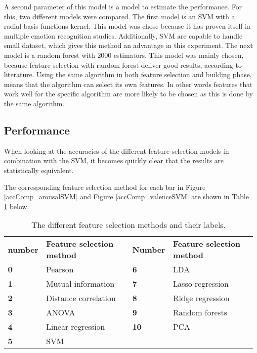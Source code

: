 \npar
A second parameter of this model is a model to estimate the performance. For this, two different models were compared. The first model is an SVM with a radial basis functions kernel. This model was chose because it has proven itself in multiple emotion recognition studies. Additionally, SVM are capable to handle small dataset, which gives this method an advantage in this experiment. The next model is a random forest with 2000 estimators. This model was mainly chosen, because feature selection with random forest deliver good results, according to literature\citep{rfPaper}. Using the same algorithm in both feature selection and building phase, means that the algorithm can select its own features. In other words features that work well for the specific algorithm are more likely to be chosen as this is done by the same algorithm.

\clearpage

\subsection{Performance}

When looking at the accuracies of the different feature selection models in combination with the SVM, it becomes quickly clear that the results are statistically equivalent. 

The corresponding feature selection method for each bar in Figure \ref{accComp_arousalSVM} and Figure \ref{accComp_valenceSVM} are shown in Table \ref{accCompLbl} below.

\begin{table}[H]
\centering
\begin{tabular}{ll|ll}
\textbf{number} & \textbf{Feature selection method} & \textbf{Number} & \textbf{Feature selection method} \\
\textbf{0}      & Pearson                           & \textbf{6}      & LDA                      \\
\textbf{1}      & Mutual information                & \textbf{7}      & Lasso regression         \\
\textbf{2}      & Distance correlation              & \textbf{8}      & Ridge regression         \\
\textbf{3}      & ANOVA                             & \textbf{9}      & Random forests           \\
\textbf{4}      & Linear regression                 & \textbf{10}     & PCA                      \\
\textbf{5}      & SVM                      &        &                         
\end{tabular}
\caption{The different feature selection methods and their labels\label{accCompLbl}.}
\end{table}


